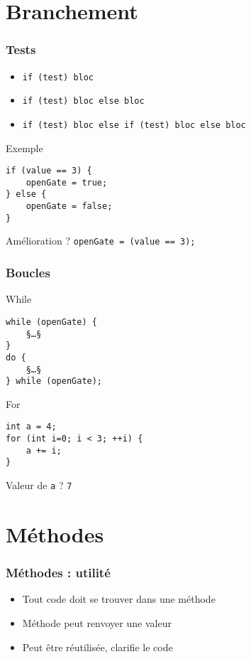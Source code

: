 \documentclass[english, french]{beamer}
\begin{document}
\section{Branchement}
\begin{frame}[fragile]
	\frametitle{Tests}
	\begin{itemize}
		\item \texttt{if (test) bloc}
		\item \texttt{if (test) bloc else bloc}
		\item \texttt{if (test) bloc else if (test) bloc else bloc}
	\end{itemize}
	\begin{block}{Exemple}
		\begin{lstlisting}
if (value == 3) {
	openGate = true;
} else {
	openGate = false;
}
		\end{lstlisting}	
	\end{block}
	Amélioration ? \pause \texttt{openGate = (value == 3);}
\end{frame}

\begin{frame}[fragile]
	\frametitle{Boucles}
	\begin{block}{While}
		\begin{lstlisting}
while (openGate) {
	§…§
}
do {
	§…§
} while (openGate);
		\end{lstlisting}	
	\end{block}
	\begin{block}{For}
		\begin{lstlisting}
int a = 4;
for (int i=0; i < 3; ++i) {
	a += i;
}
		\end{lstlisting}	
	\end{block}
	Valeur de \texttt{a} ? \pause \texttt{7}
\end{frame}

\section{Méthodes}
\begin{frame}[fragile]
	\frametitle{Méthodes : utilité}
	\begin{itemize}
		\item Tout code doit se trouver dans une méthode
		\item Méthode peut renvoyer une valeur
		\item Peut être réutilisée, clarifie le code
	\end{itemize}
\end{frame}
\end{document}
